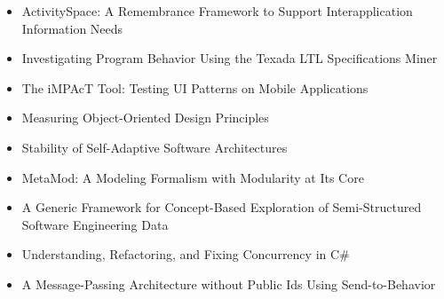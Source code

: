 {\begin{itemize}[itemsep=-1ex]
  \item ActivitySpace: A Remembrance Framework to Support Interapplication Information Needs
  \item Investigating Program Behavior Using the Texada LTL Specifications Miner
  \item The iMPAcT Tool: Testing UI Patterns on Mobile Applications
  \item Measuring Object-Oriented Design Principles
  \item Stability of Self-Adaptive Software Architectures
  \item MetaMod: A Modeling Formalism with Modularity at Its Core
  \item A Generic Framework for Concept-Based Exploration of Semi-Structured Software Engineering Data
  \item Understanding, Refactoring, and Fixing Concurrency in C\#
  \item A Message-Passing Architecture without Public Ids Using Send-to-Behavior
\end{itemize}
}


